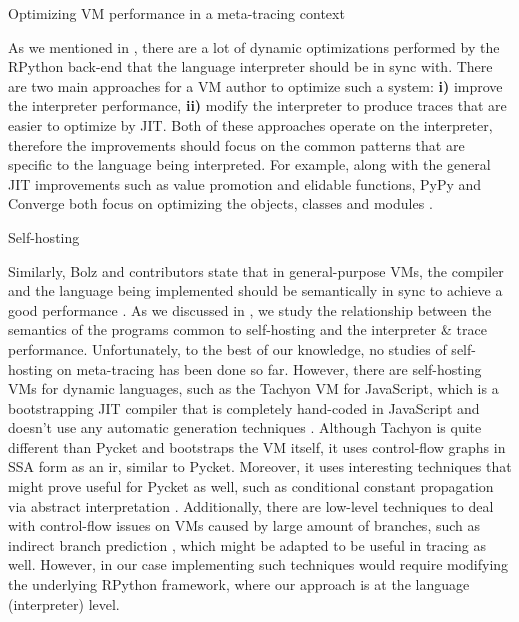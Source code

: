         \begin{paragraph-here}%
            Optimizing VM performance in a meta-tracing context

            As we mentioned in , there are a lot of dynamic
            optimizations performed by the RPython back-end that the language
            interpreter should be in sync with. There are two main approaches for
            a VM author to optimize such a system: \textbf{i)} improve the
            interpreter performance, \textbf{ii)} modify the interpreter to
            produce traces that are easier to optimize by JIT. Both of these
            approaches operate on the interpreter, therefore the improvements
            should focus on the common patterns that are specific to the language
            being interpreted. For example, along with the general JIT
            improvements such as value promotion and elidable functions, PyPy and
            Converge both focus on optimizing the objects, classes and modules
            \cite{bolz15-meta-vm}.
        \end{paragraph-here}

        \begin{paragraph-here}%
            Self-hosting

            Similarly, Bolz and contributors state that in general-purpose VMs,
            the compiler and the language being implemented should be semantically
            in sync to achieve a good performance \cite{bolzHowNotWrite,
            runtime-feedback:11}. As we discussed in
            , we study the relationship between the
            semantics of the programs common to self-hosting and the interpreter
            \& trace performance. Unfortunately, to the best of our knowledge, no
            studies of self-hosting on meta-tracing has been done so far. However,
            there are self-hosting VMs for dynamic languages, such as the Tachyon
            VM for JavaScript, which is a bootstrapping JIT compiler that is
            completely hand-coded in JavaScript and doesn't use any automatic
            generation techniques \cite{self-hosted-tachyon}. Although Tachyon is
            quite different than Pycket and bootstraps the VM itself, it uses
            control-flow graphs in SSA form as an \gls{ir}, similar to Pycket. Moreover, it uses interesting techniques that
            might prove useful for Pycket as well, such as conditional constant
            propagation via abstract interpretation \cite{sccp:91}. Additionally,
            there are low-level techniques to deal with control-flow issues on VMs
            caused by large amount of branches, such as indirect branch prediction
            \cite{branch-predict:03}, which might be adapted to be useful in
            tracing as well. However, in our case implementing such techniques
            would require modifying the underlying RPython framework, where our
            approach is at the language (interpreter) level.
        \end{paragraph-here}

